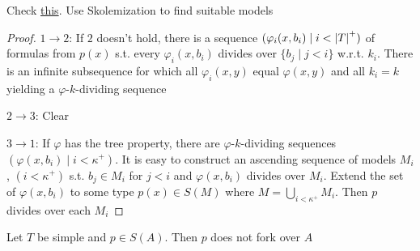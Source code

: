 \documentclass[11pt]{article}
\begin{document}
Check \href{https://math.stackexchange.com/questions/3948865/the-tree-property-and-dividing-types}{this}. Use Skolemization to find suitable models

\begin{proof}
\(1\to 2\): If \(2\) doesn't hold, there is a sequence \((\varphi_i(x,b_i)\mid i<\abs{T}^+)\) of formulas
from \(p(x)\) s.t. every \(\varphi_i(x,b_i)\) divides over \(\{b_j\mid j<i\}\) w.r.t. \(k_i\). There is an
infinite subsequence for which all \(\varphi_i(x,y)\) equal \(\varphi(x,y)\) and all \(k_i=k\) yielding a
\(\varphi\)-\(k\)-dividing sequence

\(2\to 3\): Clear

\(3\to 1\): If \(\varphi\) has the tree property, there are \(\varphi\)-\(k\)-dividing sequences \((\varphi(x,b_i)\mid i<\kappa^+)\).
It is easy to construct an ascending sequence of models \(M_i\), \((i<\kappa^+)\) s.t. \(b_j\in M_i\)
for \(j<i\) and \(\varphi(x,b_i)\) divides over \(M_i\). Extend the set of \(\varphi(x,b_i)\) to some
type \(p(x)\in S(M)\) where \(M=\bigcup_{i<\kappa^+}M_i\). Then \(p\) divides over each \(M_i\)

\end{proof}

\begin{corollary}[]
\label{cor7.2.6}
Let \(T\) be simple and \(p\in S(A)\). Then \(p\) does not fork over \(A\)
\end{corollary}
\end{document}

